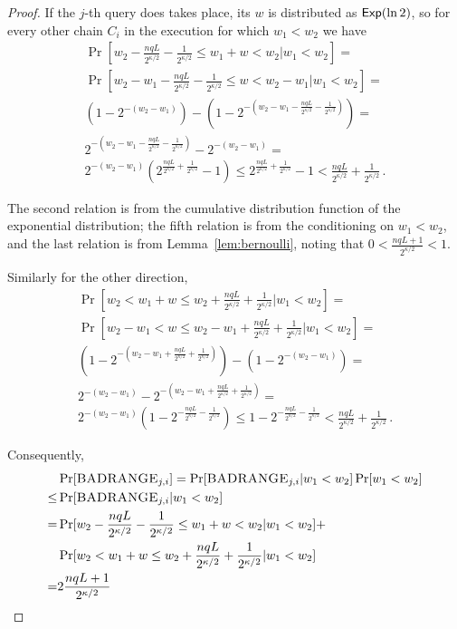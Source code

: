 \begin{proof}
  If the $j$-th query does takes place, its $w$ is distributed as $\textsf{Exp}(\ln2)$,
  so for every other chain $C_i$ in the execution for which $w_1 < w_2$ we have
  \begin{align*}
    \Pr[w_2 - \frac{nqL}{2^{\kappa/2}} - \frac{1}{2^{\kappa/2}} \leq w_1 + w < w_2 | w_1 < w_2] = \\
    \Pr[w_2 - w_1 - \frac{nqL}{2^{\kappa/2}} - \frac{1}{2^{\kappa/2}} \leq w < w_2 - w_1 | w_1 < w_2] = \\
    (1 - 2^{-(w_2 - w_1)}) - (1 - 2^{-\left(w_2 - w_1 - \frac{nqL}{2^{\kappa/2}} - \frac{1}{2^{\kappa/2}}\right)}) = \\
    2^{-\left(w_2 - w_1 - \frac{nqL}{2^{\kappa/2}} - \frac{1}{2^{\kappa/2}}\right)} - 2^{-(w_2 - w_1)} = \\
    2^{-(w_2 - w_1)} (2^{\frac{nqL}{2^{\kappa/2}} + \frac{1}{2^{\kappa/2}}} - 1) \leq
    2^{\frac{nqL}{2^{\kappa/2}} + \frac{1}{2^{\kappa/2}}} - 1 <
    \frac{nqL}{2^{\kappa/2}} + \frac{1}{2^{\kappa/2}}\,.
  \end{align*}

  The second relation is from the cumulative distribution function of the exponential distribution;
  the fifth relation is from the conditioning on $w_1 < w_2$, and the last relation is from
  Lemma~\ref{lem:bernoulli}, noting that $0 < \frac{nqL + 1}{2^{\kappa/2}} < 1$.

  Similarly for the other direction,
  \begin{align*}
    \Pr[w_2 < w_1 + w \leq w_2 + \frac{nqL}{2^{\kappa/2}} + \frac{1}{2^{\kappa/2}} | w_1 < w_2] = \\
    \Pr[w_2 - w_1 < w \leq w_2 - w_1 + \frac{nqL}{2^{\kappa/2}} + \frac{1}{2^{\kappa/2}} | w_1 < w_2] = \\
    (1 - 2^{-\left(w_2 - w_1 + \frac{nqL}{2^{\kappa/2}} + \frac{1}{2^{\kappa/2}}\right)}) - (1 - 2^{-(w_2 - w_1)}) = \\
    2^{-(w_2 - w_1)} - 2^{-\left(w_2 - w_1 + \frac{nqL}{2^{\kappa/2}} + \frac{1}{2^{\kappa/2}}\right)} = \\
    2^{-(w_2 - w_1)} (1 - 2^{-\frac{nqL}{2^{\kappa/2}} - \frac{1}{2^{\kappa/2}}}) \leq
    1 - 2^{-\frac{nqL}{2^{\kappa/2}} - \frac{1}{2^{\kappa/2}}} <
    \frac{nqL}{2^{\kappa/2}} + \frac{1}{2^{\kappa/2}}\,.
  \end{align*}

  Consequently,
  \begin{align*}
      &\Pr[\textsc{BADRANGE}_{j,i}]
    = \Pr[\textsc{BADRANGE}_{j,i}|w_1 < w_2]\Pr[w_1 < w_2]\\
    \leq & \Pr[\textsc{BADRANGE}_{j,i}|w_1 < w_2]\\
    = &\Pr[w_2 - \frac{nqL}{2^{\kappa/2}} - \frac{1}{2^{\kappa/2}} \leq w_1 + w < w_2 | w_1 < w_2] +\\
      &\Pr[w_2 < w_1 + w \leq w_2 + \frac{nqL}{2^{\kappa/2}} + \frac{1}{2^{\kappa/2}} | w_1 < w_2]\\
    = &2 \frac{nqL + 1}{2^{\kappa/2}}\\
  \end{align*}


\end{proof}
